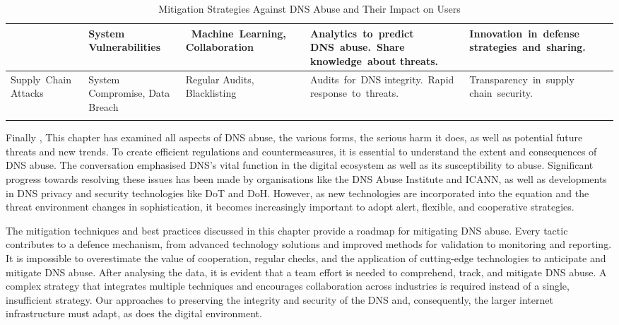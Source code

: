 {\begin{longtable}{|p{2.5cm}|p{2.5cm}|p{4cm}|p{3cm}|p{4cm}|}
{\mbox{Exploiting} Emerging \mbox{Technologies} & System \mbox{Vulnerabilities} &\mbox{ Machine Learning,} \mbox{Collaboration} & \mbox{Analytics to predict} \mbox{DNS abuse. Share} \mbox{knowledge about} \mbox{threats.} & \mbox{Innovation in defense}  \mbox{strategies and sharing.} \\ \hline

\mbox{Supply Chain} \mbox{Attacks} & \mbox{System} \mbox{Compromise,} Data Breach & Regular Audits, Blacklisting & \mbox{Audits for DNS} \mbox{integrity. Rapid} \mbox{response to threats.} & \mbox{Transparency in supply} \mbox{chain security.} \\ \hline

\caption{Mitigation Strategies Against DNS Abuse and Their Impact on Users} 

\end{longtable}

}

Finally , This chapter has examined all aspects of DNS abuse,  the various forms, the serious harm it does, as well as potential future threats and new trends. To create efficient regulations and countermeasures, it is essential to understand the extent and consequences of DNS abuse. The conversation emphasised DNS's vital function in the digital ecosystem as well as its susceptibility to abuse. Significant progress towards resolving these issues has been made by organisations like the DNS Abuse Institute and ICANN, as well as developments in DNS privacy and security technologies like DoT and DoH. However, as new technologies are incorporated into the equation and the threat environment changes in sophistication, it becomes increasingly important to adopt alert, flexible, and cooperative strategies.  

The mitigation techniques and best practices discussed in this chapter provide a roadmap for mitigating DNS abuse. Every tactic contributes to a defence mechanism, from advanced technology solutions and improved methods for validation to monitoring and reporting. It is impossible to overestimate the value of cooperation, regular checks, and the application of cutting-edge technologies to anticipate and mitigate DNS abuse. After analysing the data, it is evident that a team effort is needed to comprehend, track, and mitigate DNS abuse. A complex strategy that integrates multiple techniques and encourages collaboration across industries is required instead of a single, insufficient strategy. Our approaches to preserving the integrity and security of the DNS and, consequently, the larger internet infrastructure must adapt, as does the digital environment.

